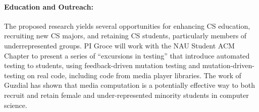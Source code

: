 \paragraph{Education and Outreach:}
The proposed research yields several opportunities for enhancing CS
education, recruiting new CS majors, and retaining CS students,
particularly members of underrepresented groups.  
PI Groce will work with the NAU Student ACM Chapter to present a
series of ``excursions in testing'' that introduce automated testing
to students, using feedback-driven mutation testing  and
mutation-driven-testing on real code, including code from
media player libraries.  The work of Guzdial
\cite{Guzdial} has shown that media computation is a
potentially effective way to both recruit and retain female and
under-represented minority students in computer science.
